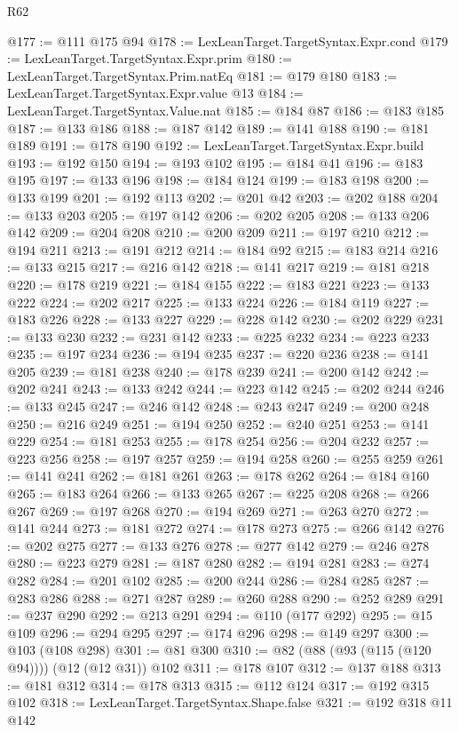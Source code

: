 \begin{lexlean}{R62}
\begin{coremodule}
@177 := @111 @175 @94
@178 := LexLeanTarget.TargetSyntax.Expr.cond
@179 := LexLeanTarget.TargetSyntax.Expr.prim
@180 := LexLeanTarget.TargetSyntax.Prim.natEq
@181 := @179 @180
@183 := LexLeanTarget.TargetSyntax.Expr.value @13
@184 := LexLeanTarget.TargetSyntax.Value.nat
@185 := @184 @87
@186 := @183 @185
@187 := @133 @186
@188 := @187 @142
@189 := @141 @188
@190 := @181 @189
@191 := @178 @190
@192 := LexLeanTarget.TargetSyntax.Expr.build
@193 := @192 @150
@194 := @193 @102
@195 := @184 @41
@196 := @183 @195
@197 := @133 @196
@198 := @184 @124
@199 := @183 @198
@200 := @133 @199
@201 := @192 @113
@202 := @201 @42
@203 := @202 @188
@204 := @133 @203
@205 := @197 @142
@206 := @202 @205
@208 := @133 @206 @142
@209 := @204 @208
@210 := @200 @209
@211 := @197 @210
@212 := @194 @211
@213 := @191 @212
@214 := @184 @92
@215 := @183 @214
@216 := @133 @215
@217 := @216 @142
@218 := @141 @217
@219 := @181 @218
@220 := @178 @219
@221 := @184 @155
@222 := @183 @221
@223 := @133 @222
@224 := @202 @217
@225 := @133 @224
@226 := @184 @119
@227 := @183 @226
@228 := @133 @227
@229 := @228 @142
@230 := @202 @229
@231 := @133 @230
@232 := @231 @142
@233 := @225 @232
@234 := @223 @233
@235 := @197 @234
@236 := @194 @235
@237 := @220 @236
@238 := @141 @205
@239 := @181 @238
@240 := @178 @239
@241 := @200 @142
@242 := @202 @241
@243 := @133 @242
@244 := @223 @142
@245 := @202 @244
@246 := @133 @245
@247 := @246 @142
@248 := @243 @247
@249 := @200 @248
@250 := @216 @249
@251 := @194 @250
@252 := @240 @251
@253 := @141 @229
@254 := @181 @253
@255 := @178 @254
@256 := @204 @232
@257 := @223 @256
@258 := @197 @257
@259 := @194 @258
@260 := @255 @259
@261 := @141 @241
@262 := @181 @261
@263 := @178 @262
@264 := @184 @160
@265 := @183 @264
@266 := @133 @265
@267 := @225 @208
@268 := @266 @267
@269 := @197 @268
@270 := @194 @269
@271 := @263 @270
@272 := @141 @244
@273 := @181 @272
@274 := @178 @273
@275 := @266 @142
@276 := @202 @275
@277 := @133 @276
@278 := @277 @142
@279 := @246 @278
@280 := @223 @279
@281 := @187 @280
@282 := @194 @281
@283 := @274 @282
@284 := @201 @102
@285 := @200 @244
@286 := @284 @285
@287 := @283 @286
@288 := @271 @287
@289 := @260 @288
@290 := @252 @289
@291 := @237 @290
@292 := @213 @291
@294 := @110 (@177 @292)
@295 := @15 @109
@296 := @294 @295
@297 := @174 @296
@298 := @149 @297
@300 := @103 (@108 @298)
@301 := @81 @300
@310 := @82 (@88 (@93 (@115 (@120 @94)))) (@12 (@12 @31)) @102
@311 := @178 @107
@312 := @137 @188
@313 := @181 @312
@314 := @178 @313
@315 := @112 @124
@317 := @192 @315 @102
@318 := LexLeanTarget.TargetSyntax.Shape.false
@321 := @192 @318 @11 @142

\end{coremodule}
\end{lexlean}
